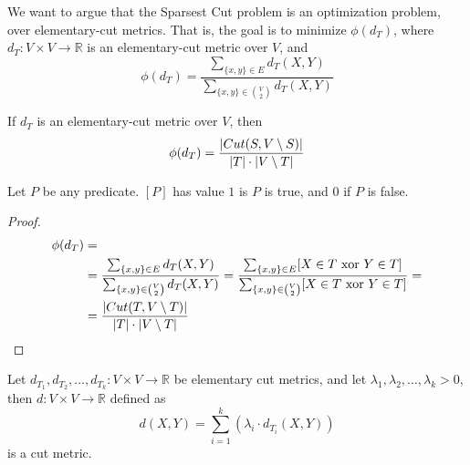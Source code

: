     We want to argue that the Sparsest Cut problem is an optimization problem, over elementary-cut metrics.
    That is, the goal is to minimize $\phi(d_T)$, where $d_T : V \times V \rightarrow \mathbb{R}$ is an elementary-cut metric over $V$, and
    \[ \phi(d_T) = \dfrac{\sum_{\{x,y\} \in E} d_T(X,Y)}{\sum_{\{x,y\} \in \binom{V}{2}} d_T(X,Y)} \]

    \begin{lemma}\label{lemma:metric2}
        If $d_T$ is an elementary-cut metric over $V$, then
        \[ \phi(d_T) = \dfrac{\vert Cut(S, V \setminus S) \vert}{\vert T \vert \cdot \vert V \setminus T \vert} \]
    \end{lemma}

    Let $P$ be any predicate. $[P]$ has value $1$ is $P$ is true, and $0$ if $P$ is false.

    \begin{proof}


        \begin{equation*}
            \begin{split}
                \phi(d_T)   &=\\
                            &= \dfrac{\sum_{\{x,y\} \in E} d_T(X,Y)}{\sum_{\{x,y\} \in \binom{V}{2}} d_T(X,Y)} = \dfrac{\sum_{\{x,y\} \in E} [X \in T \text{ xor } Y \in T]}{\sum_{\{x,y\} \in \binom{V}{2}} [X \in T \text{ xor } Y \in T]} =\\
                            &= \dfrac{\vert Cut(T, V \setminus T) \vert}{\vert T \vert \cdot \vert V \setminus T \vert}
            \end{split}
        \end{equation*}
    \end{proof}

    \begin{definition}
        Let $d_{T_1}, d_{T_2}, \dots, d_{T_k} : V \times V \rightarrow \mathbb{R}$ be elementary cut metrics, and let $\lambda_1, \lambda_2, \dots, \lambda_k > 0$, then $d : V \times V \rightarrow \mathbb{R}$ defined as
        \[ d(X,Y) = \sum_{i=1}^{k}(\lambda_i \cdot d_{T_i}(X,Y)) \]
        is a cut metric.
    \end{definition}

